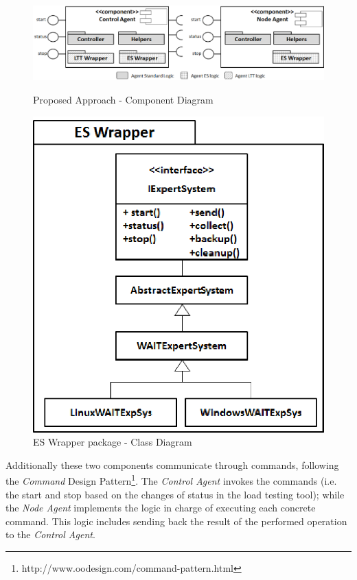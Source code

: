 \documentclass[runningheads,a4paper]{llncs}
\begin{document}
\begin{figure}
\centering
\begin{minipage}[b]{.69\textwidth}

\centering
\includegraphics[totalheight=.25\textheight,width=1.0\textwidth]{Components}
\caption{Proposed Approach - Component Diagram}
\label{fig_components}

\end{minipage}\qquad
\begin{minipage}[b]{.25\textwidth}

\centering
\includegraphics[totalheight=.25\textheight,width=1.0\textwidth]{Wrapper}
\caption{ES Wrapper package - Class Diagram}
\label{fig_wrapper}

\end{minipage}
\end{figure}

Additionally these two components communicate through commands, following the
\emph{Command} Design Pattern\footnote{http://www.oodesign.com/command-pattern.html}. The
\emph{Control Agent} invokes the commands (i.e. the start and stop based on the
changes of status in the load testing tool); while the \emph{Node Agent}
implements the logic in charge of executing each concrete command. This logic
includes sending back the result of the performed operation to the \emph{Control Agent}.
\end{document}
